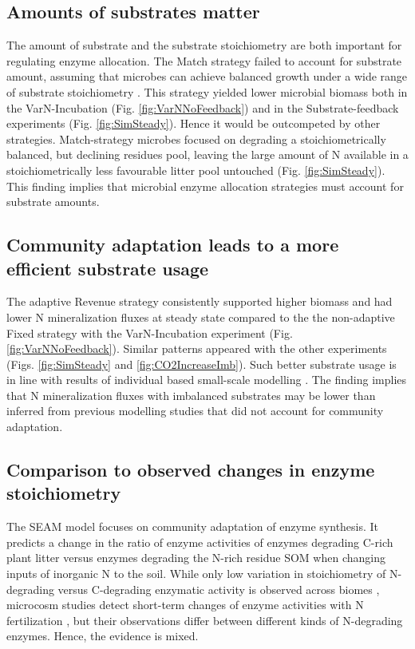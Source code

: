 \subsection{Amounts of substrates matter}
The amount of substrate and the substrate stoichiometry are both important for
regulating enzyme allocation. The Match strategy failed to account for substrate
amount, assuming that microbes can achieve balanced growth under a wide range of
substrate stoichiometry \citep{Moorhead12, Ballantyne14}. This strategy yielded
lower microbial biomass both in the VarN-Incubation (Fig.
\ref{fig:VarNNoFeedback}) and in the Substrate-feedback experiments (Fig.
\ref{fig:SimSteady}). Hence it would be outcompeted by other strategies.
Match-strategy microbes focused on degrading a stoichiometrically balanced, but
declining residues pool, leaving the large amount of N available in a
stoichiometrically less favourable litter pool untouched (Fig.
\ref{fig:SimSteady}). This finding implies that microbial enzyme allocation
strategies must account for substrate amounts.

\subsection{Community adaptation leads to a more efficient substrate usage}
The adaptive Revenue strategy consistently supported higher biomass and had
lower N mineralization fluxes at steady state compared to the the non-adaptive
Fixed strategy with the VarN-Incubation experiment (Fig.
\ref{fig:VarNNoFeedback}). Similar patterns appeared with the other experiments
(Figs. \ref{fig:SimSteady} and \ref{fig:CO2IncreaseImb}). Such better substrate
usage is in line with results of individual based small-scale modelling
\citep{Kaiser14}.
The finding implies that N mineralization fluxes with imbalanced substrates may
be lower than inferred from previous modelling studies that did not account for
community adaptation.

\subsection{Comparison to observed changes in enzyme stoichiometry}

The SEAM model focuses on community adaptation of enzyme synthesis. It predicts
a change in the ratio of enzyme activities of enzymes degrading C-rich plant
litter versus enzymes degrading the N-rich residue SOM when changing inputs of
inorganic N to the soil.
While only low variation in stoichiometry of N-degrading versus C-degrading
enzymatic activity is observed across biomes \citep{Sinsabaugh09}, microcosm
studies detect short-term changes of enzyme activities with N fertilization
\citep{Kumar16}, but their observations differ between different kinds of
N-degrading enzymes. Hence, the evidence is mixed.

